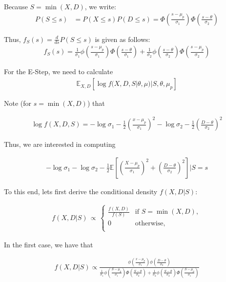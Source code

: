 \documentclass[11pt, oneside]{article}   	%
\theoremstyle{ModifiedStyle}
\begin{document}
			Because $S = \min(X,D)$, we write:
			\begin{align*}
				P(S \leq s) &= P(X \leq s) P(D \leq s) = \Phi(\frac{s-\mu_p}{\sigma_1}) \Phi(\frac{s-\theta}{\sigma_2})
			\end{align*}

			Thus, $f_S(s) = \frac{d}{ds} P(S \leq s)$ is given as follows:
			\begin{align*}
				f_S(s) = \frac{1}{\sigma_1} \phi(\frac{s-\mu_p}{\sigma_1}) \Phi(\frac{s-\theta}{\sigma_1}) + \frac{1}{\sigma_2}\phi(\frac{s-\theta}{\sigma_2}) \Phi(\frac{s-\mu_p}{\sigma_2})
			\end{align*}

			For the E-Step, we need to calculate
			\begin{align*}
				\mathbb{E}_{X,D}[\log f(X,D,S|\theta,\mu) | S,\theta,\mu_p]
			\end{align*}

			Note (for $s = \min(X,D)$) that

			\begin{align*}
				\log f(X,D,S) = -\log \sigma_1 - \frac{1}{2}(\frac{x-\mu_p}{\sigma_1})^2 - \log \sigma_2 - \frac{1}{2} (\frac{D-\theta}{\sigma_2})^2
			\end{align*}

			Thus, we are interested in computing

			\begin{align*}
				-\log \sigma_1 - \log \sigma_2 - \frac{1}{2} \mathbb{E}[(\frac{X-\mu_p}{\sigma_1})^2 + (\frac{D-\theta}{\sigma_2})^2] | S=s
			\end{align*}

			To this end, lets first derive the conditional density $f(X,D|S)$:

			\begin{align*}
			f(X,D|S) \,\propto\, \left \{\!\! \begin{array}{ll}
			\frac{f(X,D)}{f(S)} & \text{if } S= \min(X,D), \\
			0 & \text{otherwise}, \\
			\end{array} \right.
			\end{align*}

			In the first case, we have that

			\begin{align}
				f(X,D|S) \propto \frac{\phi(\frac{x-\mu_p}{\sigma_1}) \phi(\frac{D-\theta}{\sigma_2})}{\frac{1}{\sigma_1} \phi(\frac{S-\mu_p}{\sigma_1}) \Phi(\frac{S-\theta}{\sigma_2}) + \frac{1}{\sigma_2} \phi(\frac{S-\theta}{\sigma_2}) \Phi(\frac{S-\mu_p}{\sigma_1})}
			\end{align}
\end{document}
